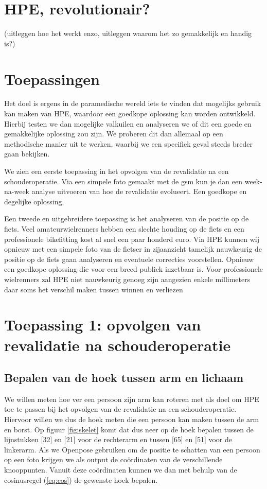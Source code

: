 \documentclass{article}
\begin{document}
\section{HPE, revolutionair?}
(uitleggen hoe het werkt enzo, uitleggen waarom het zo gemakkelijk en handig is?)



\section{Toepassingen}
Het doel is ergens in de paramedische wereld iets te vinden dat mogelijks gebruik kan maken van HPE, waardoor een goedkope oplossing kan worden ontwikkeld. Hierbij testen we dan mogelijke valkuilen en analyseren we of dit een goede en gemakkelijke oplossing zou zijn. We proberen dit dan allemaal op een methodische manier uit te werken, waarbij we een specifiek geval steeds breder gaan bekijken.

We zien een eerste toepassing in het opvolgen van de revalidatie na een schouderoperatie. Via een simpele foto gemaakt met de gsm kun je dan een week-na-week analyse uitvoeren van hoe de revalidatie evolueert. Een goedkope en degelijke oplossing.

Een tweede en uitgebreidere toepassing is het analyseren van de positie op de fiets. Veel amateurwielrenners hebben een slechte houding op de fiets en een professionele bikefitting kost al snel een paar honderd euro. Via HPE kunnen wij opnieuw met een simpele foto van de fietser in zijaanzicht tamelijk nauwkeurig de positie op de fiets gaan analyseren en eventuele correcties voorstellen. Opnieuw een goedkope oplossing die voor een breed publiek inzetbaar is. Voor professionele wielrenners zal HPE niet nauwkeurig genoeg zijn aangezien enkele millimeters daar soms het verschil maken tussen winnen en verliezen

\section{Toepassing 1: opvolgen van revalidatie na schouderoperatie}
	\subsection{Bepalen van de hoek tussen arm en lichaam}

We willen meten hoe ver een persoon zijn arm kan roteren met als doel om HPE toe te passen bij het opvolgen van de revalidatie na een schouderoperatie. Hiervoor willen we dus de hoek meten die een persoon kan maken tussen de arm en borst. Op figuur \ref{fig:skelet} komt dat dus neer op de hoek bepalen tussen de lijnstukken [32] en [21] voor de rechterarm en tussen [65] en [51] voor de linkerarm. Als we Openpose gebruiken om de positie te schatten van een persoon op een foto krijgen we als output de coördinaten van de verschillende knooppunten. Vanuit deze coördinaten kunnen we dan met behulp van de cosinusregel (\ref{eq:cos}) de gewenste hoek bepalen.
\end{document}
